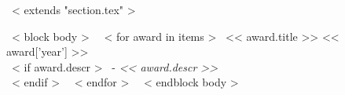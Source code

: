 ~< extends "section.tex" >~

~< block body >~
  ~< for award in items >~
    << award.title >> \hfill << award['year'] >> \\
    ~< if award.descr >~
    - {\footnotesize {\textit{<< award.descr >>}}} \\
    ~< endif >~
  ~< endfor >~
\vspace{-.15in}
~< endblock body >~


